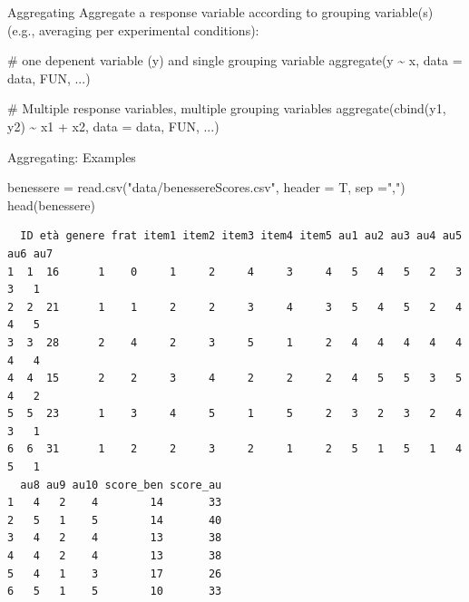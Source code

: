 \documentclass[
  ignorenonframetext,
]{beamer}
\newenvironment{Shaded}{\begin{snugshade}}{\end{snugshade}}
\newcommand{\AttributeTok}[1]{\textcolor[rgb]{0.00,0.34,0.68}{#1}}
\newcommand{\CommentTok}[1]{\textcolor[rgb]{0.54,0.53,0.53}{#1}}
\newcommand{\FunctionTok}[1]{\textcolor[rgb]{0.39,0.29,0.61}{#1}}
\newcommand{\NormalTok}[1]{\textcolor[rgb]{0.12,0.11,0.11}{#1}}
\newcommand{\OtherTok}[1]{\textcolor[rgb]{0.00,0.43,0.16}{#1}}
\newcommand{\SpecialCharTok}[1]{\textcolor[rgb]{0.24,0.68,0.91}{#1}}
\newcommand{\StringTok}[1]{\textcolor[rgb]{0.75,0.01,0.01}{#1}}
\begin{document}
\begin{frame}[fragile]{Aggregating}
\protect\hypertarget{aggregating}{}
Aggregate a response variable according to grouping variable(s) (e.g.,
averaging per experimental conditions):

\begin{Shaded}
\begin{Highlighting}[]
\CommentTok{\# one depenent variable (y) and single grouping variable}
\FunctionTok{aggregate}\NormalTok{(y }\SpecialCharTok{\textasciitilde{}}\NormalTok{ x, }\AttributeTok{data =}\NormalTok{ data, FUN, ...)}

\CommentTok{\# Multiple response variables, multiple grouping variables}
\FunctionTok{aggregate}\NormalTok{(}\FunctionTok{cbind}\NormalTok{(y1, y2) }\SpecialCharTok{\textasciitilde{}}\NormalTok{ x1 }\SpecialCharTok{+}\NormalTok{ x2, }\AttributeTok{data =}\NormalTok{ data, FUN, ...)}
\end{Highlighting}
\end{Shaded}
\end{frame}

\begin{frame}[fragile]{Aggregating: Examples}
\protect\hypertarget{aggregating-examples}{}
\begin{Shaded}
\begin{Highlighting}[]
\NormalTok{benessere }\OtherTok{=} \FunctionTok{read.csv}\NormalTok{(}\StringTok{"data/benessereScores.csv"}\NormalTok{, }\AttributeTok{header =}\NormalTok{ T, }\AttributeTok{sep =}\StringTok{","}\NormalTok{)}
\FunctionTok{head}\NormalTok{(benessere)}
\end{Highlighting}
\end{Shaded}

\begin{verbatim}
  ID età genere frat item1 item2 item3 item4 item5 au1 au2 au3 au4 au5 au6 au7
1  1  16      1    0     1     2     4     3     4   5   4   5   2   3   3   1
2  2  21      1    1     2     2     3     4     3   5   4   5   2   4   4   5
3  3  28      2    4     2     3     5     1     2   4   4   4   4   4   4   4
4  4  15      2    2     3     4     2     2     2   4   5   5   3   5   4   2
5  5  23      1    3     4     5     1     5     2   3   2   3   2   4   3   1
6  6  31      1    2     2     3     2     1     2   5   1   5   1   4   5   1
  au8 au9 au10 score_ben score_au
1   4   2    4        14       33
2   5   1    5        14       40
3   4   2    4        13       38
4   4   2    4        13       38
5   4   1    3        17       26
6   5   1    5        10       33
\end{verbatim}
\end{frame}
\end{document}
